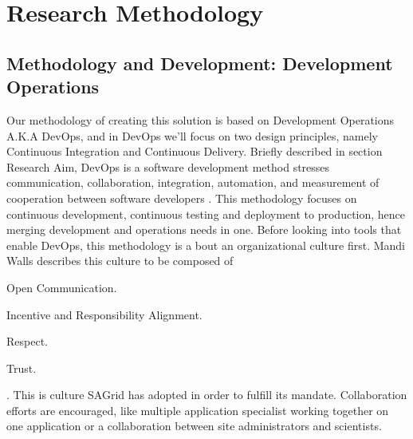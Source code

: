 \documentclass [titlepage,11pt]{article}
\begin{document}
\section{Research Methodology}

\subsection{Methodology and Development: Development Operations}
Our methodology of creating this solution is based on Development Operations A.K.A DevOps, and in DevOps we'll focus on two design principles, namely Continuous Integration and Continuous Delivery. Briefly described in section Research Aim, DevOps is a software development method  stresses communication, collaboration, integration, automation, and measurement of cooperation between software developers \cite{wikiOps}. This methodology focuses on continuous development, continuous testing and deployment to production, hence merging development and operations needs in one. Before looking into tools that enable DevOps, this methodology is a bout an organizational culture first. Mandi Walls describes this culture to be composed of \begin{enumerate*}[label=\itshape\alph*\upshape)]
\item Open Communication.
\item Incentive and Responsibility Alignment.
\item Respect.
\item Trust. 
\end{enumerate*} \citep{mandi13}. This is culture SAGrid has adopted in order to fulfill its mandate. Collaboration efforts are encouraged, like multiple application specialist working together on one application or a collaboration between site administrators and scientists. \\
\end{document}
